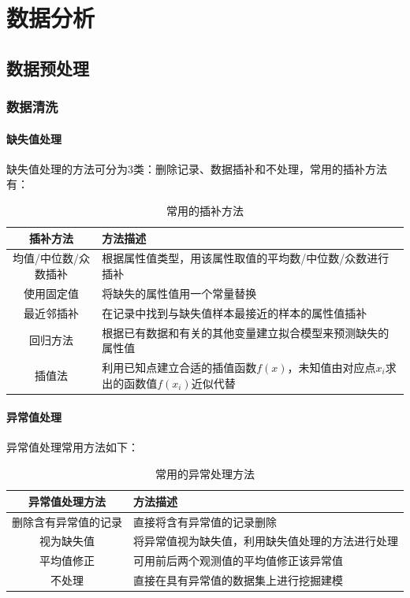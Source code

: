 \documentclass[openany]{progbookcn}
\begin{document}
\part{数据分析}
\chapter{数据预处理}
\section{数据清洗}
\subsection{缺失值处理}
\indent 缺失值处理的方法可分为3类：删除记录、数据插补和不处理，常用的插补方法有：
\begin{table}[h]
\centering
\begin{tabular}{|c|l|}
\hline
{\bf 插补方法} & {\bf 方法描述}\\
\hline
均值/中位数/众数插补 & 根据属性值类型，用该属性取值的平均数/中位数/众数进行插补\\
\hline
使用固定值 & 将缺失的属性值用一个常量替换\\
\hline
最近邻插补 & 在记录中找到与缺失值样本最接近的样本的属性值插补\\
\hline
回归方法 & 根据已有数据和有关的其他变量建立拟合模型来预测缺失的属性值\\
\hline
插值法 & 利用已知点建立合适的插值函数$f(x)$，未知值由对应点$x_i$求出的函数值$f(x_i)$近似代替\\
\hline
\end{tabular}
\caption{常用的插补方法}
\end{table}

\subsection{异常值处理}
\indent 异常值处理常用方法如下：
\begin{table}[h]
\centering
\begin{tabular}{|c|l|}
\hline
{\bf 异常值处理方法}&{\bf 方法描述}\\
\hline
删除含有异常值的记录 & 直接将含有异常值的记录删除\\
\hline
视为缺失值 & 将异常值视为缺失值，利用缺失值处理的方法进行处理\\
\hline
平均值修正 & 可用前后两个观测值的平均值修正该异常值\\
\hline
不处理 & 直接在具有异常值的数据集上进行挖掘建模\\
\hline
\end{tabular}
\caption{常用的异常处理方法}
\end{table}
\end{document}
